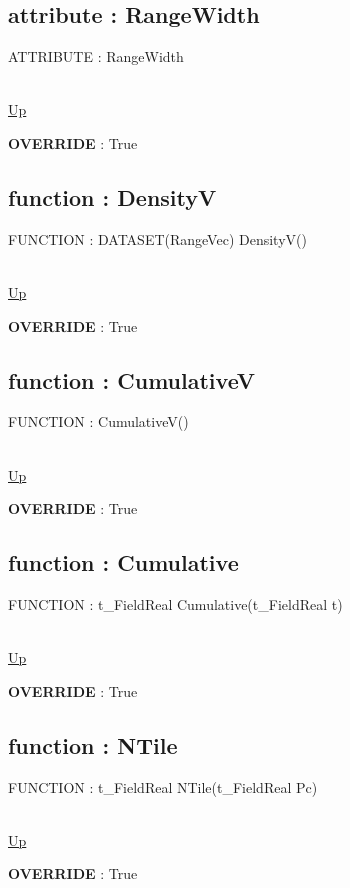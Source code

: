 \subsection*{attribute : RangeWidth}
\hypertarget{ecldoc:linearregression.ols.distributionbase.rangewidth}{ATTRIBUTE : RangeWidth} \\
\hyperlink{ecldoc:linearregression.ols.normaldistribution}{Up} \\
\par
\textbf{OVERRIDE} : True \\
\subsection*{function : DensityV}
\hypertarget{ecldoc:linearregression.ols.distributionbase.densityv}{FUNCTION : DATASET(RangeVec) DensityV()} \\
\hyperlink{ecldoc:linearregression.ols.normaldistribution}{Up} \\
\par
\textbf{OVERRIDE} : True \\
\subsection*{function : CumulativeV}
\hypertarget{ecldoc:linearregression.ols.distributionbase.cumulativev}{FUNCTION : CumulativeV()} \\
\hyperlink{ecldoc:linearregression.ols.normaldistribution}{Up} \\
\par
\textbf{OVERRIDE} : True \\
\subsection*{function : Cumulative}
\hypertarget{ecldoc:linearregression.ols.distributionbase.cumulative}{FUNCTION : t\_FieldReal Cumulative(t\_FieldReal t)} \\
\hyperlink{ecldoc:linearregression.ols.normaldistribution}{Up} \\
\par
\textbf{OVERRIDE} : True \\
\subsection*{function : NTile}
\hypertarget{ecldoc:linearregression.ols.distributionbase.ntile}{FUNCTION : t\_FieldReal NTile(t\_FieldReal Pc)} \\
\hyperlink{ecldoc:linearregression.ols.normaldistribution}{Up} \\
\par
\textbf{OVERRIDE} : True \\
